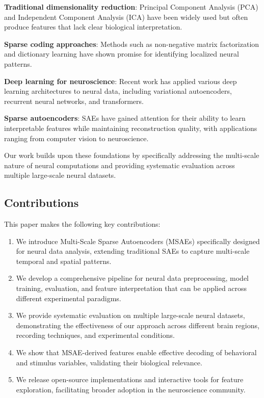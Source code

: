 \textbf{Traditional dimensionality reduction}: Principal Component Analysis (PCA) and Independent Component Analysis (ICA) have been widely used but often produce features that lack clear biological interpretation.

\textbf{Sparse coding approaches}: Methods such as non-negative matrix factorization and dictionary learning have shown promise for identifying localized neural patterns.

\textbf{Deep learning for neuroscience}: Recent work has applied various deep learning architectures to neural data, including variational autoencoders, recurrent neural networks, and transformers.

\textbf{Sparse autoencoders}: SAEs have gained attention for their ability to learn interpretable features while maintaining reconstruction quality, with applications ranging from computer vision to neuroscience.

Our work builds upon these foundations by specifically addressing the multi-scale nature of neural computations and providing systematic evaluation across multiple large-scale neural datasets.

\subsection{Contributions}

This paper makes the following key contributions:

\begin{enumerate}
\item We introduce Multi-Scale Sparse Autoencoders (MSAEs) specifically designed for neural data analysis, extending traditional SAEs to capture multi-scale temporal and spatial patterns.

\item We develop a comprehensive pipeline for neural data preprocessing, model training, evaluation, and feature interpretation that can be applied across different experimental paradigms.

\item We provide systematic evaluation on multiple large-scale neural datasets, demonstrating the effectiveness of our approach across different brain regions, recording techniques, and experimental conditions.

\item We show that MSAE-derived features enable effective decoding of behavioral and stimulus variables, validating their biological relevance.

\item We release open-source implementations and interactive tools for feature exploration, facilitating broader adoption in the neuroscience community.
\end{enumerate}
